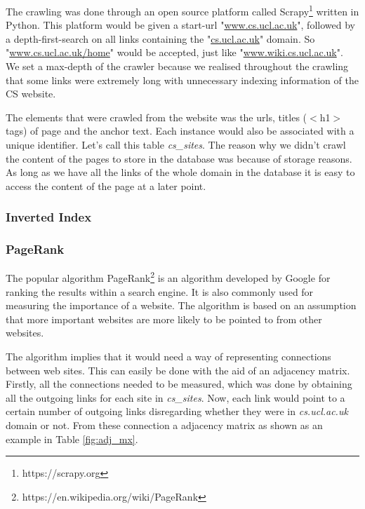 The crawling was done through an open source platform called Scrapy\footnote{https://scrapy.org} written in Python. This platform would be given a start-url "\url{www.cs.ucl.ac.uk}", followed by a depth-first-search on all links containing the "\url{cs.ucl.ac.uk}" domain. So "\url{www.cs.ucl.ac.uk/home}" would be accepted, just like "\url{www.wiki.cs.ucl.ac.uk}". We set a max-depth of the crawler because we realised throughout the crawling that some links were extremely long with unnecessary indexing information of the CS website.

The elements that were crawled from the website was the urls, titles ($<$h1$>$ tags) of page and the anchor text. Each instance would also be associated with a unique identifier. Let's call this table \emph{cs\_sites}. The reason why we didn't crawl the content of the pages to store in the database was because of storage reasons. As long as we have all the links of the whole domain in the database it is easy to access the content of the page at a later point.


\subsubsection{Inverted Index} %
\label{ssub:inverted_index}


\subsubsection{PageRank} %
\label{ssub:pagerank}

The popular algorithm PageRank\footnote{https://en.wikipedia.org/wiki/PageRank} is an algorithm developed by Google for ranking the results within a search engine. It is also commonly used for measuring the importance of a website. The algorithm is based on an assumption that more important websites are more likely to be pointed to from other websites.

The algorithm implies that it would need a way of representing connections between web sites. This can easily be done with the aid of an adjacency matrix. Firstly, all the connections needed to be measured, which was done by obtaining all the outgoing links for each site in \emph{cs\_sites}. Now, each link would point to a certain number of outgoing links disregarding whether they were in \emph{cs.ucl.ac.uk} domain or not. From these connection a adjacency matrix as shown as an example in Table \ref{fig:adj_mx}. 


